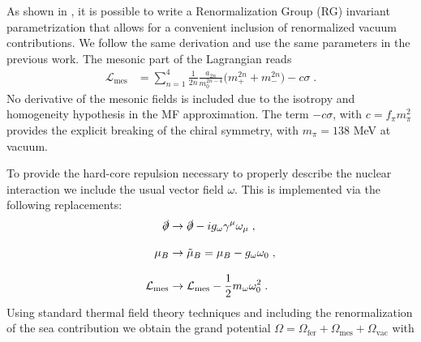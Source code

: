 \documentclass[aps,twocolumn,prd,superscriptaddress,nofootinbib,floatfix]{revtex4-2}
\newcommand{\mub}{\mu_{{B}}}
\renewcommand{\c}{\; ,}
\newcommand{\p}{\; .}
\begin{document}
As shown in \cite{Recchi:2025pyy}, it is possible to write a Renormalization Group (RG) invariant parametrization that allows for a convenient inclusion of renormalized vacuum contributions. We follow the same derivation and use the same parameters in the previous work.
The mesonic part of the Lagrangian reads
\begin{equation}\label{eq:U}
    \begin{split}
        \mathcal{L}_{\mathrm{mes}} &= \sum_{n=1}^4 \frac{1}{2n} \frac{a_{2n}}{m_0^{2n-4}} \Big(m_+^{2n} + m_-^{2n}\Big) - c\sigma \p
    \end{split}
\end{equation}
No derivative of the mesonic fields is included due to the isotropy and homogeneity hypothesis in the MF approximation. The term $-c\sigma$, with $c=f_\pi m_\pi^2$ provides the explicit breaking of the chiral symmetry, with $m_\pi=138$ MeV at vacuum.

To provide the hard-core repulsion necessary to properly describe the nuclear interaction we include the usual vector field $\omega$. This is implemented via the following replacements: 
\begin{align}
	\slashed{\partial} &\to \slashed{\partial} - ig_\omega \gamma^\mu \omega_\mu \c\\[2ex]
    \mub &\to \tilde{\mu}_B =  \mub - g_\omega \omega_0  \c \\[2ex]
    \mathcal{L}_\mathrm{mes}  &\to  \mathcal{L}_\mathrm{mes}   - \frac{1}{2}m_\omega \omega_0^2 \p   
\end{align}
Using standard thermal field theory techniques and including the renormalization of the sea contribution we obtain the grand potential $\Omega = \Omega_\mathrm{fer} + \Omega_\mathrm{mes} + \Omega_\mathrm{vac}$ with
\end{document}
